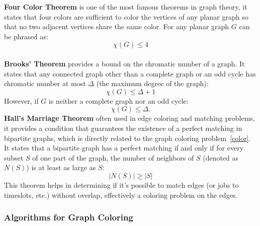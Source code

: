\documentclass[12pt]{article}
\begin{document}
    \textbf{Four Color Theorem}\label{fct} is one of the most famous theorems in
    graph theory, it states that four colors are sufficient to color the vertices
    of any planar graph so that no two adjacent vertices share the same color.
    For any planar graph \( G \) can be phrased as:
    \begin{equation}
        \chi(G) \leq 4
    \end{equation}
    \\
    \textbf{Brooks' Theorem} provides a bound on the chromatic number of a graph.
    It states that any connected graph other than a complete graph or an odd cycle
    has chromatic number at most $\Delta$ (the maximum degree of the graph):
    \begin{equation}
        \chi(G) \leq \Delta + 1
    \end{equation}
    However, if \( G \) is neither a complete graph nor an odd cycle:
    \begin{equation}
            \chi(G) \leq \Delta.
    \end{equation}
    \textbf{Hall's Marriage Theorem} often used in edge coloring and matching problems, it provides a condition
    that guarantees the existence of a perfect matching in bipartite graphs,
    which is directly related to the graph coloring problem~\ref{color}.
    It states that a bipartite graph has a perfect matching if and only if for every
    subset \( S \) of one part of the graph, the number of neighbors of \( S \)
    (denoted as \( N(S) \)) is at least as large as \( S \):
    \begin{equation}
            |N(S)| \geq |S|
    \end{equation}
    This theorem helps in determining if it's possible to match edges (or jobs to
    timeslots, etc.) without overlap, effectively a coloring problem on the edges.

    \subsubsection{Algorithms for Graph Coloring}
\end{document}
